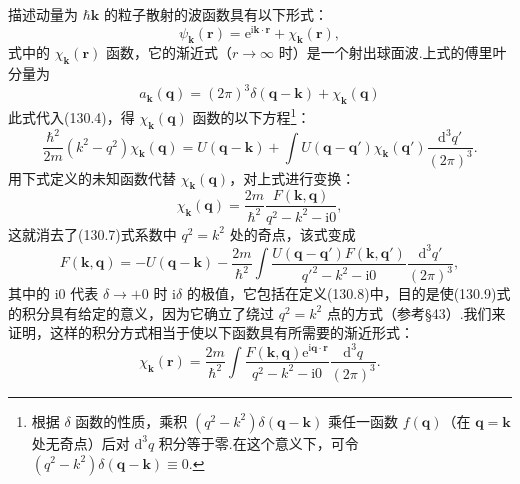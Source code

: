 描述动量为 $\hbar\boldsymbol{k}$ 的粒子散射的波函数具有以下形式：
\begin{equation}
  \psi_{\boldsymbol{k}}(\boldsymbol{r})
  =\mathrm{e}^{\mathrm{i}\boldsymbol{k}\cdot\boldsymbol{r}}
  +\chi_{\boldsymbol{k}}(\boldsymbol{r}),
\end{equation}
式中的 $\chi_{\boldsymbol{k}}(\boldsymbol{r})$ 函数，它的渐近式（$r\to\infty$ 时）是一个射出球面波.上式的傅里叶分量为
\begin{equation}
  a_{\boldsymbol{k}}(\boldsymbol{q})=(2\pi)^3
  \delta(\boldsymbol{q}-\boldsymbol{k})+\chi_{\boldsymbol{k}}(\boldsymbol{q})
\end{equation}
此式代入(130.4)，得 $\chi_{\boldsymbol{k}}(\boldsymbol{q})$ 函数的以下方程\footnote{根据 $\delta$ 函数的性质，乘积 $(q^2-k^2)\delta(\boldsymbol{q}-\boldsymbol{k})$ 乘任一函数 $f(\boldsymbol{q})$（在 $\boldsymbol{q}=\boldsymbol{k}$ 处无奇点）后对 $\mathrm{d}^3q$ 积分等于零.在这个意义下，可令 $(q^2-k^2)\delta(\boldsymbol{q}-\boldsymbol{k})\equiv0$.}：
\begin{equation}
  \frac{\hbar^2}{2m}(k^2-q^2)\chi_{\boldsymbol{k}}(\boldsymbol{q})
  =U(\boldsymbol{q}-\boldsymbol{k})
  +\int U(\boldsymbol{q}-\boldsymbol{q}')\chi_{\boldsymbol{k}}(\boldsymbol{q}')
  \frac{\mathrm{d}^3q'}{(2\pi)^3}.
\end{equation}
用下式定义的未知函数代替 $\chi_{\boldsymbol{k}}(\boldsymbol{q})$，对上式进行变换：
\begin{equation}
  \chi_{\boldsymbol{k}}(\boldsymbol{q})=\frac{2m}{\hbar^2}
  \frac{F(\boldsymbol{k},\boldsymbol{q})}{q^2-k^2-\mathrm{i}0},
\end{equation}
这就消去了(130.7)式系数中 $q^2=k^2$ 处的奇点，该式变成
\begin{equation}
  F(\boldsymbol{k},\boldsymbol{q})=-U(\boldsymbol{q}-\boldsymbol{k})
  -\frac{2m}{\hbar^2}\int
  \frac{U(\boldsymbol{q}-\boldsymbol{q}')F(\boldsymbol{k},\boldsymbol{q}')}{q'^2-k^2-\mathrm{i}0}
  \frac{\mathrm{d}^3q'}{(2\pi)^3},
\end{equation}
其中的 $\mathrm{i}0$ 代表 $\delta\to+0$ 时 $\mathrm{i}\delta$ 的极值，它包括在定义(130.8)中，目的是使(130.9)式的积分具有给定的意义，因为它确立了绕过 $q^2=k^2$ 点的方式（参考§43）.我们来证明，这样的积分方式相当于使以下函数具有所需要的渐近形式：
\begin{equation}
  \chi_{\boldsymbol{k}}(\boldsymbol{r})=\frac{2m}{\hbar^2}\int
  \frac{F(\boldsymbol{k},\boldsymbol{q})
  \mathrm{e}^{\mathrm{i}\boldsymbol{q}\cdot\boldsymbol{r}}}{q^2-k^2-\mathrm{i}0}
  \frac{\mathrm{d}^3q}{(2\pi)^3}.
\end{equation}
